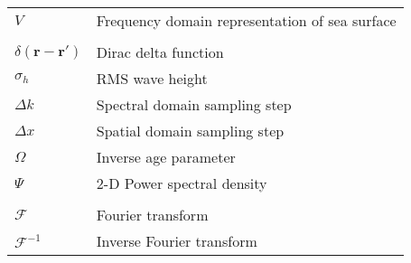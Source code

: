 \begin{supertabular}{ll}
$V$ & Frequency domain representation of sea surface\\
\\
$\delta\left(\mathbf{r}-\mathbf{r}' \right)$ & Dirac delta function \\
$\sigma_h$ & RMS wave height \\
$\Delta k$ & Spectral domain sampling step \\
$\Delta x$ & Spatial domain sampling step \\
$\Omega$ & Inverse age parameter \\
$\Psi $ & 2-D Power spectral density \\
\\
$\mathcal{F}$ & Fourier transform \\
$\mathcal{F}^{-1}$ & Inverse Fourier transform \\
\end{supertabular}